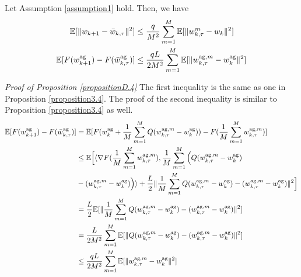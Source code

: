 \begin{proposition} \label{propositionD.4}
Let Assumption \ref{assumption1} hold. Then, we have
\begin{align*}
    \mathbb{E}[\|w_{k+1} - \Bar{w}_{k, \tau}\|^2] &\leq \frac{q}{M^2}\sum_{m=1}^M \mathbb{E}[\|w_{k, \tau}^m - w_k\|^2] \\
    \mathbb{E}[F(w_{k+1}^{\textrm{ag}}) - F(\Bar{w}_{k, \tau}^{\textrm{ag}})] &\leq \frac{qL}{2M^2} \sum_{m=1}^M \mathbb{E}[\|w_{k, \tau}^{\textrm{ag}, m} - w_k^{\textrm{ag}}\|^2]
\end{align*}
\end{proposition}

\emph{Proof of Proposition \ref{propositionD.4}} \textrm{ } The first inequality is the same as one in Proposition \ref{proposition3.4}.
The proof of the second inequality is similar to Proposition \ref{proposition3.4} as well.
\begin{align*}
    \mathbb{E}[F(w_{k+1}^{\textrm{ag}}) - F(\Bar{w}_{k, \tau}^{\textrm{ag}})] &= \mathbb{E}[F(w_k^{\textrm{ag}} + \frac{1}{M}\sum_{m=1}^M Q(w_{k, \tau}^{\textrm{ag}, m} - w_k^{\textrm{ag}})) - F(\frac{1}{M}\sum_{m=1}^M w_{k, \tau}^{\textrm{ag}, m})] \\
    &\leq \mathbb{E}\Big[ \langle \nabla F(\frac{1}{M} \sum_{m=1}^M w_{k, \tau}^{\textrm{ag}, m}), \frac{1}{M} \sum_{m=1}^M \Big( Q(w_{k, \tau}^{\textrm{ag}, m} - w_k^{\textrm{ag}}) \\
    &- (w_{k, \tau}^{\textrm{ag}, m} - w_k^{\textrm{ag}})\Big) \rangle + \frac{L}{2} \|\frac{1}{M} \sum_{m=1}^M  Q(w_{k, \tau}^{\textrm{ag}, m} - w_k^{\textrm{ag}}) - (w_{k, \tau}^{\textrm{ag}, m} - w_k^{\textrm{ag}})\|^2\Big] \\
    &= \frac{L}{2} \mathbb{E}[\|\frac{1}{M} \sum_{m=1}^M  Q(w_{k, \tau}^{\textrm{ag}, m} - w_k^{\textrm{ag}}) - (w_{k, \tau}^{\textrm{ag}, m} - w_k^{\textrm{ag}})\|^2] \\
    &= \frac{L}{2M^2}\sum_{m=1}^M \mathbb{E}[\| Q(w_{k, \tau}^{\textrm{ag}, m} - w_k^{\textrm{ag}}) - (w_{k, \tau}^{\textrm{ag}, m} - w_k^{\textrm{ag}})\|^2] \\
    &\leq \frac{qL}{2M^2} \sum_{m=1}^M \mathbb{E}[\|w_{k, \tau}^{\textrm{ag}, m} - w_k^{\textrm{ag}}\|^2]
\end{align*}

